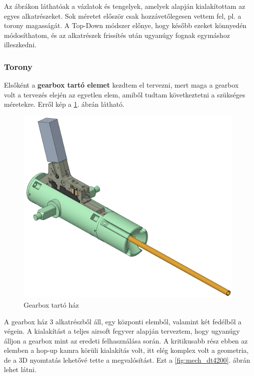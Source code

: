 \documentclass[12pt,a4paper]{article}
\begin{document}
Az ábrákon láthatóak a vázlatok és tengelyek, amelyek alapján kialakítottam az egyes alkatrészeket. Sok méretet először csak hozzávetőlegesen vettem fel, pl. a torony magasságát. A Top-Down módszer előnye, hogy később ezeket könnyedén módosíthatom, és az alkatrészek frissítés után ugyanúgy fognak egymáshoz illeszkedni.

\pagebreak

\subsubsection{Torony}

Elsőként a \textbf{gearbox tartó elemet} kezdtem el tervezni, mert maga a gearbox volt a tervezés elején az egyetlen elem, amiből tudtam következtetni a szükséges méretekre. Erről kép a \ref{fig:mech_dt4000}. ábrán látható. 

\begin{figure}[h!]
	\centering
	\includegraphics[width=0.8\linewidth]{mech_dt4000}
	\caption{Gearbox tartó ház}
	\label{fig:mech_dt4000}
\end{figure}

A gearbox ház 3 alkatrészből áll, egy központi elemből, valamint két fedélből a végein. A kialakítást a teljes airsoft fegyver alapján terveztem, hogy ugyanúgy álljon a gearbox mint az eredeti felhasználása során. A kritikusabb rész ebben az elemben a hop-up kamra körüli kialakítás volt, itt elég komplex volt a geometria, de a 3D nyomtatás lehetővé tette a megvalósítást. Ezt a \ref{fig:mech_dt4200}. ábrán lehet látni.
\end{document}
